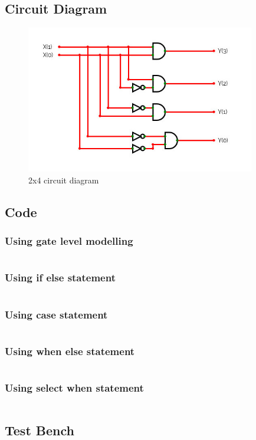 \documentclass[titlepage]{article}
\begin{document}
    \subsection{Circuit Diagram}
    \begin{figure}[!ht]
        \centering
        \includegraphics[width=10cm]{./figures/2x4.jpeg}
        \caption{2x4 circuit diagram}
    \end{figure}
    \subsection{Code}
    \subsubsection{Using gate level modelling}
        \inputminted{vhdl}{./codes/a3_2_1a.vhd}
    \subsubsection{Using if else statement} 
        \inputminted{vhdl}{./codes/a3_2_1ba.vhd}
    \subsubsection{Using case statement}
        \inputminted{vhdl}{./codes/a3_2_1bb.vhd}
    \subsubsection{Using when else statement}
        \inputminted{vhdl}{./codes/a3_2_1bc.vhd}
    \subsubsection{Using select when statement}
        \inputminted{vhdl}{./codes/a3_2_1bd.vhd}
    \subsection{Test Bench}
    \inputminted{vhdl}{./codes/tb_a3_2_1a.vhd}
\end{document}
